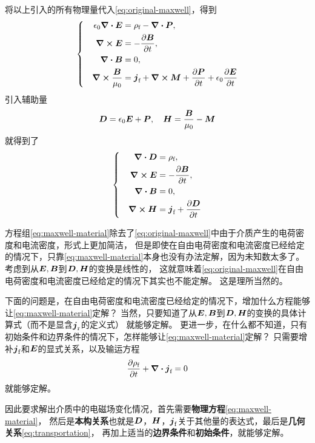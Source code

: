 \documentclass[UTF8, a4paper]{ctexart}
\newenvironment{bigcase}{\left\{\quad\begin{aligned}}{\end{aligned}\right.}
\begin{document}
将以上引入的所有物理量代入\eqref{eq:original-maxwell}，得到
\[
    \begin{bigcase}
        \epsilon_0 \div{\vb*{E}} &= \rho_\text{f} - \div{\vb*{P}}, \\
        \curl{\vb*{E}} &= - \pdv{\vb*{B}}{t}, \\
        \div{\vb*{B}} &= 0, \\
        \curl{\frac{\vb*{B}}{\mu_0}} &= \vb*{j}_\text{f} + \curl{\vb*{M}} + \pdv{\vb*{P}}{t} + \epsilon_0 \pdv{\vb*{E}}{t}
    \end{bigcase}
\]
引入辅助量
\[
    \vb*{D} = \epsilon_0 \vb*{E} + \vb*{P}, \quad \vb*{H} = \frac{\vb*{B}}{\mu_0} - \vb*{M}
\]
就得到了
\begin{equation}
    \begin{bigcase}
        \div{\vb*{D}} &= \rho_\text{f}, \\
        \curl{\vb*{E}} &= - \pdv{\vb*{B}}{t}, \\
        \div{\vb*{B}} &= 0, \\
        \curl{\vb*{H}} &= \vb*{j}_\text{f} + \pdv{\vb*{D}}{t}
    \end{bigcase}
    \label{eq:maxwell-material}
\end{equation}

方程组\eqref{eq:maxwell-material}除去了\eqref{eq:original-maxwell}中由于介质产生的电荷密度和电流密度，形式上更加简洁，
但是即使在自由电荷密度和电流密度已经给定的情况下，只靠\eqref{eq:maxwell-material}本身也没有办法定解，因为未知数太多了。
考虑到从$\vb*{E}, \vb*{B}$到$\vb*{D}, \vb*{H}$的变换是线性的，
这就意味着\eqref{eq:original-maxwell}在自由电荷密度和电流密度已经给定的情况下其实也不能定解。
这是理所当然的。

下面的问题是，在自由电荷密度和电流密度已经给定的情况下，增加什么方程能够让\eqref{eq:maxwell-material}定解？
当然，只要知道了从$\vb*{E}, \vb*{B}$到$\vb*{D}, \vb*{H}$的变换的具体计算式（而不是显含$\vb*{j}_\text{r}$的定义式）
就能够定解。
更进一步，在什么都不知道，只有初始条件和边界条件的情况下，怎样能够让\eqref{eq:maxwell-material}定解？
只需要增补$\vb*{j}_\text{f}$和$\vb*{E}$的显式关系，以及输运方程
\begin{equation}
    \pdv{\rho_\text{f}}{t} + \div{\vb*{j}_\text{f}} = 0
    \label{eq:transportation}
\end{equation}
就能够定解。

因此要求解出介质中的电磁场变化情况，首先需要\textbf{物理方程}\eqref{eq:maxwell-material}，
然后是\textbf{本构关系}也就是$\vb*{D}$，$\vb*{H}$，$\vb*{j}_\text{f}$关于其他量的表达式，最后是\textbf{几何关系}\eqref{eq:transportation}，
再加上适当的\textbf{边界条件}和\textbf{初始条件}，就能够定解。
\end{document}
